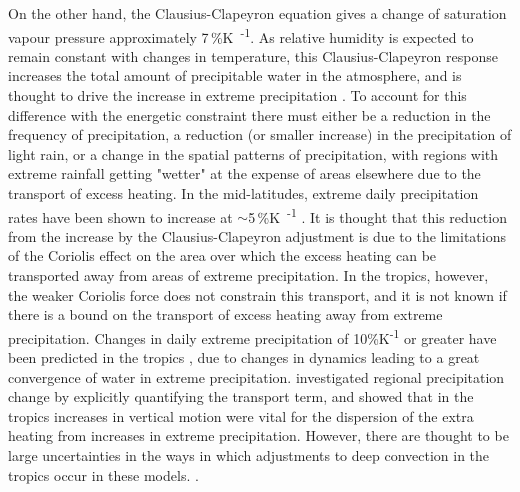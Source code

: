 On the other hand, the Clausius-Clapeyron equation gives a change of saturation vapour pressure approximately 7\,\%\unit{K\textsuperscript{-1}}.
As relative humidity is expected to remain constant with changes in temperature, this Clausius-Clapeyron response increases the total amount of precipitable water in the atmosphere, and is thought to drive the increase in extreme precipitation \citep{ogorman_precipitation_2015}.
To account for this difference with the energetic constraint there must either be a reduction in the frequency of precipitation, a reduction (or smaller increase) in the precipitation of light rain, or a change in the spatial patterns of precipitation, with regions with extreme rainfall getting "wetter" at the expense of areas elsewhere due to the transport of excess heating.
In the mid-latitudes, extreme daily precipitation rates have been shown to increase at $\sim$5\,\%\unit{K\textsuperscript{-1}} \citep{ogorman_physical_2009}.
It is thought that this reduction from the increase by the Clausius-Clapeyron adjustment is due to the limitations of the Coriolis effect on the area over which the excess heating can be transported away from areas of extreme precipitation.
In the tropics, however, the weaker Coriolis force does not constrain this transport, and it is not known if there is a bound on the transport of excess heating away from extreme precipitation.
Changes in daily extreme precipitation of 10\%K\textsuperscript{-1} or greater have been predicted in the tropics \citep{ogorman_energetic_2012}, due to changes in dynamics leading to a great convergence of water in extreme precipitation.
\citet{muller_energetic_2011} investigated regional precipitation change by explicitly quantifying the transport term, and showed that in the tropics increases in vertical motion were vital for the dispersion of the extra heating from increases in extreme precipitation.
However, there are thought to be large uncertainties in the ways in which adjustments to deep convection in the tropics occur in these models. \citep{westra_future_2014}.

